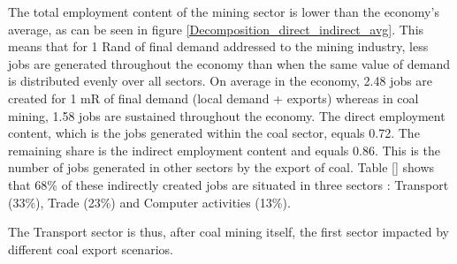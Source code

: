 \documentclass[12pt,english]{article}
\begin{document}
%


The total employment content of the mining sector is lower than the economy's average, as can be seen in figure \ref{Decomposition_direct_indirect_avg}. This means that for 1 Rand of final demand addressed to the mining industry, less jobs are generated throughout the economy than when the same value of demand is distributed evenly over all sectors. On average in the economy, 2.48 jobs are created for 1 mR of final demand (local demand + exports) whereas in coal mining, 1.58 jobs are sustained throughout the economy. %
The direct employment content, which is the jobs generated within the coal sector, equals 0.72. The remaining share is the indirect employment content and equals 0.86. This is the number of jobs generated in other sectors by the export of coal. Table \ref{} shows that 68\% of these indirectly created jobs are situated in three sectors : Transport (33\%), Trade (23\%) and Computer activities (13\%). 

The Transport sector is thus, after coal mining itself, the first sector impacted by different coal export scenarios. 


\end{document}
